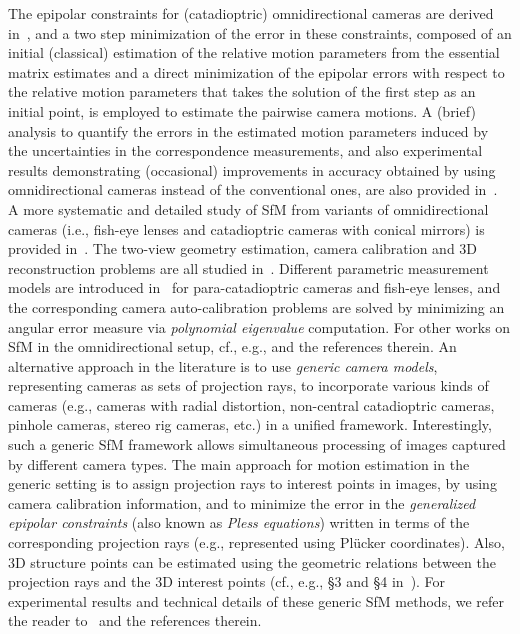\documentclass[10pt]{article}
\begin{document}
The epipolar constraints for (catadioptric) omnidirectional cameras are derived in~\cite{OmniSfM}, and a two step minimization of the error in these constraints, composed of an initial (classical) estimation of the relative motion parameters from the essential matrix estimates and a direct minimization of the epipolar errors with respect to the relative motion parameters that takes the solution of the first step as an initial point, is employed to estimate the pairwise camera motions. A (brief) analysis to quantify the errors in the estimated motion parameters induced by the uncertainties in the correspondence measurements, and also experimental results demonstrating (occasional) improvements in accuracy obtained by using omnidirectional cameras instead of the conventional ones, are also provided in~\cite{OmniSfM}. A more systematic and detailed study of SfM from variants of omnidirectional cameras (i.e., fish-eye lenses and catadioptric cameras with conical mirrors) is provided in~\cite{MicusikWideCam}. The two-view geometry estimation, camera calibration and $3$D reconstruction problems are all studied in~\cite{MicusikWideCam}. Different parametric measurement models are introduced in~\cite{MicusikWideCam} for para-catadioptric cameras and fish-eye lenses, and the corresponding camera auto-calibration problems are solved by minimizing an angular error measure via \textit{polynomial eigenvalue} computation. For other works on SfM in the omnidirectional setup, cf., e.g., \cite{OmniExtra1,OmniExtra2,GenericExtra1,OmniExtra3} and the references therein. An alternative approach in the literature is to use \textit{generic camera models}, representing cameras as sets of projection rays, to incorporate various kinds of cameras (e.g., cameras with radial distortion, non-central catadioptric cameras, pinhole cameras, stereo rig cameras, etc.) in a unified framework. Interestingly, such a generic SfM framework allows simultaneous processing of images captured by different camera types. The main approach for motion estimation in the generic setting is to assign projection rays to interest points in images, by using camera calibration information, and to minimize the error in the \textit{generalized epipolar constraints} (also known as \textit{Pless equations}) written in terms of the corresponding projection rays (e.g., represented using Pl\"{u}cker coordinates). Also, $3$D structure points can be estimated using the geometric relations between the projection rays and the $3$D interest points (cf., e.g., \S3 and \S4 in~\cite{GenericExtra2}). For experimental results and technical details of these generic SfM methods, we refer the reader to~\cite{GenericExtra2,MouragnonGeneric,GenericExtra1} and the references therein.
\end{document}
